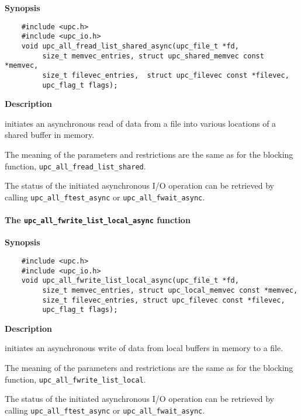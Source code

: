 {\bf Synopsis}

\npf\vspace{-2.5em}
\begin{verbatim}
    #include <upc.h>
    #include <upc_io.h>
    void upc_all_fread_list_shared_async(upc_file_t *fd, 
         size_t memvec_entries, struct upc_shared_memvec const *memvec,
         size_t filevec_entries,  struct upc_filevec const *filevec,
         upc_flag_t flags);
\end{verbatim}

{\bf Description}

 initiates an asynchronous read of data from a
file into various locations of a shared buffer in memory.

\np The meaning of the parameters and restrictions are the same as for the
blocking function, {\tt upc\_all\_fread\_list\_shared}.

\np The status of the initiated asynchronous I/O operation can be retrieved by calling
{\tt upc\_all\_ftest\_async} or {\tt upc\_all\_fwait\_async}.

\paragraph{The {\tt upc\_all\_fwrite\_list\_local\_async} function}

{\bf Synopsis}

\npf\vspace{-2.5em}
\begin{verbatim}
    #include <upc.h>
    #include <upc_io.h>
    void upc_all_fwrite_list_local_async(upc_file_t *fd,
         size_t memvec_entries, struct upc_local_memvec const *memvec,
         size_t filevec_entries, struct upc_filevec const *filevec,
         upc_flag_t flags);
\end{verbatim}

{\bf Description}

 initiates an asynchronous write of
data from local buffers in memory to a file.

\np The meaning of the parameters and restrictions are the same as for the
blocking function, {\tt upc\_all\_fwrite\_list\_local}.

\np The status of the initiated asynchronous I/O operation can be retrieved by calling
{\tt upc\_all\_ftest\_async} or {\tt upc\_all\_fwait\_async}.

